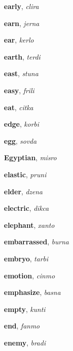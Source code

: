 \documentclass[12pt]{book}
\begin{document}
\begin{description}

\item[ ] \textbf{early}, \textit{clira}

\item[ ] \textbf{earn}, \textit{jerna}

\item[ ] \textbf{ear}, \textit{kerlo}

\item[ ] \textbf{earth}, \textit{terdi}

\item[ ] \textbf{east}, \textit{stuna}

\item[ ] \textbf{easy}, \textit{frili}

\item[ ] \textbf{eat}, \textit{citka}

\item[ ] \textbf{edge}, \textit{korbi}

\item[ ] \textbf{egg}, \textit{sovda}

\item[ ] \textbf{Egyptian}, \textit{misro}

\item[ ] \textbf{elastic}, \textit{pruni}

\item[ ] \textbf{elder}, \textit{dzena}

\item[ ] \textbf{electric}, \textit{dikca}

\item[ ] \textbf{elephant}, \textit{xanto}

\item[ ] \textbf{embarrassed}, \textit{burna}

\item[ ] \textbf{embryo}, \textit{tarbi}

\item[ ] \textbf{emotion}, \textit{cinmo}

\item[ ] \textbf{emphasize}, \textit{basna}

\item[ ] \textbf{empty}, \textit{kunti}

\item[ ] \textbf{end}, \textit{fanmo}

\item[ ] \textbf{enemy}, \textit{bradi}


\end{description}
\end{document}
